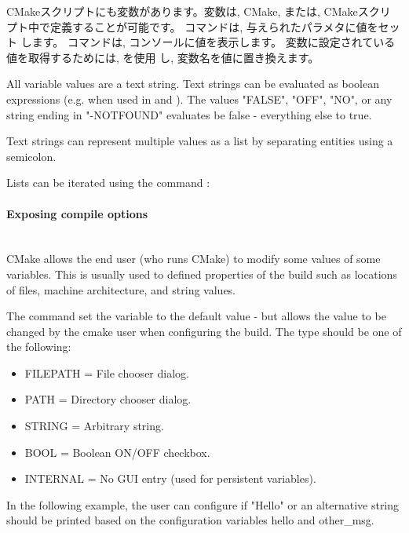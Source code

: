 \documentclass[11pt,a4paper,landscape]{scrartcl} %
\newcommand{\sectiontitle}[1]{\paragraph{#1} \ \\} %
\begin{document}
\begin{multicols}{2}
CMakeスクリプトにも変数があります。変数は, CMake, または, CMakeスクリ
プト中で定義することが可能です。
 コマンドは, 与えられたパラメタに値をセット
します。
コマンドは, コンソールに値を表示します。
変数に設定されている値を取得するためには, を使用
し, 変数名を値に置き換えます。



All variable values are a text string. Text strings can be evaluated as boolean expressions (e.g. when used in  and ). The values "FALSE", "OFF", "NO", or any string ending in "-NOTFOUND" evaluates be false - everything else to true.

Text strings can represent multiple values as a list by separating entities using a semicolon.



Lists can be iterated using the command :


			
\sectiontitle{Exposing compile options}
			
CMake allows the end user (who runs CMake) to modify some values of some variables.  This is usually used to defined properties of the build such as locations of files, machine architecture, and string values.

The command  set the variable to the default value - but allows the value to be changed by the cmake user when configuring the build. The type should be one of the following:

\begin{itemize}  
\item FILEPATH = File chooser dialog.
\item PATH     = Directory chooser dialog.
\item STRING   = Arbitrary string.
\item BOOL     = Boolean ON/OFF checkbox.
\item INTERNAL = No GUI entry (used for persistent variables).
\end{itemize}

In the following example, the user can configure if "Hello" or an alternative string should be printed based on the configuration variables hello and other\_msg.
 

\end{multicols}
\end{document}
